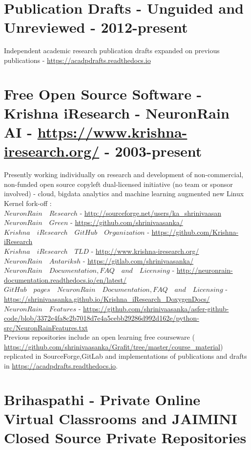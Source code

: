 \documentclass[11pt,onecolumn]{article}
\begin{document}
\section{Publication Drafts - Unguided and Unreviewed - 2012-present}
Independent academic research publication drafts expanded on previous publications - \url {https://acadpdrafts.readthedocs.io}

\section{Free Open Source Software - Krishna iResearch - NeuronRain AI - \url {https://www.krishna-iresearch.org/} - 2003-present}
Presently working individually on research and development of non-commercial, non-funded open source copyleft dual-licensed initiative (no team or sponsor involved) - cloud, bigdata analytics and machine learning augmented new Linux Kernel fork-off $:$ \\
 $NeuronRain \quad Research$ - \url {http://sourceforge.net/users/ka_shrinivaasan} \\
 $NeuronRain \quad Green$ - \url {https://github.com/shrinivaasanka/} \\
 $Krishna \quad iResearch \quad GitHub \quad Organization$ - \url {https://github.com/Krishna-iResearch} \\
 $Krishna \quad iResearch \quad TLD $ - \url {http://www.krishna-iresearch.org/} \\
  $NeuronRain \quad Antariksh$ - \url {https://gitlab.com/shrinivaasanka/} \\
 $NeuronRain \quad Documentation, FAQ \quad and \quad Licensing$ - \url {http://neuronrain-documentation.readthedocs.io/en/latest/} \\
 $GitHub \quad pages \quad NeuronRain \quad Documentation, FAQ \quad and \quad Licensing$ - \url {https://shrinivaasanka.github.io/Krishna_iResearch_DoxygenDocs/} \\
 $NeuronRain \quad Features $ - \url {https://github.com/shrinivaasanka/asfer-github-code/blob/3372e4fa8c2b7018d7e4a5cebb29286d992d162e/python-src/NeuronRainFeatures.txt} \\
Previous repositories include an open learning free courseware ( \url {https://github.com/shrinivaasanka/Grafit/tree/master/course_material})  replicated in SourceForge,GitLab and implementations of publications and drafts in \url {https://acadpdrafts.readthedocs.io}.

\section{Brihaspathi - Private Online Virtual Classrooms and JAIMINI Closed Source Private Repositories}
\end{document}
